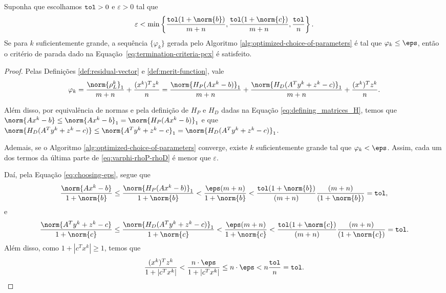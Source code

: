 \begin{corol} 
Suponha que escolhamos  $\mathtt{tol} >0 $  e $\varepsilon>0$   tal que 
\begin{equation}
	\label{eq:choosing-eps}
		\varepsilon < \min\left\{  \frac{\tol(1+\norm{b})}{m+n}, \frac{\tol(1+\norm{c})}{m+n},\frac{\tol}{n}\right\}.
\end{equation}
Se para $k$ suficientemente grande, a sequência $\{\varphi_{k}\}$ gerada pelo Algoritmo \ref{alg:optimized-choice-of-parameters} é tal que  $\varphi_{k}\leq \eps$, então o critério de parada dado na Equação~\eqref{eq:termination-criteria-pcx} é satisfeito.
\end{corol}		

\begin{proof}
	 Pelas Definições \ref{def:residual-vector} e \ref{def:merit-function}, vale
	\begin{equation}
		\label{eq:varphi-rhoP-rhoD}
				\varphi_{k} =  \frac{\norm{\rho^{k}_L}_1}{m+n} + 
\frac{(x^{k})^Tz^{k}}{n}  = \frac{\norm{H_{P}(Ax^{k} - b)}_1}{m+n} +\frac{\norm{H_{D}(A^{T}y^{k} + z^{k}- c)}_1 }{m+n} + 
\frac{(x^{k})^Tz^{k}}{n}.
	\end{equation}

Além disso, por equivalência de normas e pela definição de $H_{P}$ e $H_{D}$ dadas na Equação \eqref{eq:defining_matrices_H}, temos que $\norm{Ax^{k} - b} \leq \norm{Ax^{k} - b}_{1} = \norm{H_{P}(Ax^{k} - b)}_{1}$ e que $\norm{H_{D}(A^{T}y^{k} + z^{k}- c)} \leq \norm{A^{T}y^{k} + z^{k}- c}_1 = \norm{H_{D}(A^{T}y^{k} + z^{k}- c)}_1$.

Ademais, se  o Algoritmo \ref{alg:optimized-choice-of-parameters} converge, existe $k$ suficientemente grande tal que $\varphi_{k}<\eps$. Assim, cada um dos termos da última parte de \eqref{eq:varphi-rhoP-rhoD} é menor que $\varepsilon$.


Daí, pela Equação \eqref{eq:choosing-eps}, segue que 
\[
\dfrac{\norm{Ax^{k} - b}}{1 + \norm{b}} \leq  \frac{\norm{H_{P}(Ax^{k} - b)}_1  }{1 + \norm{b}} < \frac{\eps (m+n)}{1 + \norm{b}} <\frac{\tol(1+\norm{b})}{(m+n)} \frac{(m+n)}{(1 + \norm{b})} = \tol,
\]
e
\[
\dfrac{\norm{A^{T}y^{k} + z^{k}- c}}{1 + \norm{c}} \leq  \frac{\norm{H_{D}(A^{T}y^{k} + z^{k}- c)}_{1}  }{1 + \norm{c}} < \frac{\eps (m+n)}{1 + \norm{c}} <\frac{\tol(1+\norm{c})}{(m+n)} \frac{(m+n)}{(1 + \norm{c})} = \tol.
\]
Além disso, como $1+ |c^{T}x^{k}| \geq 1$, temos que 
\[
\dfrac{(x^{k})^{T}z^{k}}{1+ |c^{T}x^{k}|} <   \frac{n\cdot  \eps}{1+ |c^{T}x^{k}|} \leq n \cdot \eps < n \frac{\tol}{n} = \tol. \qedhere
\]
 \end{proof}

